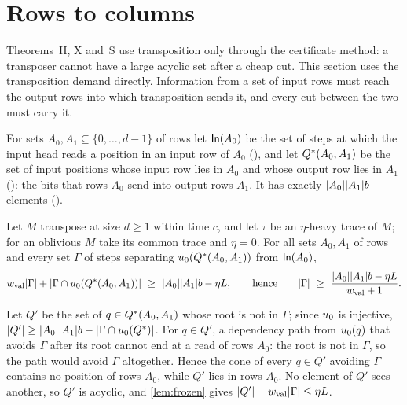 \section{Rows to columns}\label{sec:demand}

Theorems~H, X and~S use transposition only through the certificate method: a transposer cannot have a large acyclic set after
a cheap cut. This section uses the transposition demand directly. Information from a set of input rows must reach the output rows
into which transposition sends it, and every cut between the two must carry it.

For sets $A_0,A_1\subseteq\{0,\dots,d-1\}$ of rows let $\mathsf{In}(A_0)$ be the set of steps at which the input head reads a position in
an input row of $A_0$ (), and let $Q^{*}(A_0,A_1)$ be the set of input positions whose input row lies in
$A_0$ and whose output row lies in $A_1$ (): the bits that rows $A_0$ send into output rows $A_1$. It has
exactly $\lvert A_0 \rvert\lvert A_1 \rvert b$ elements ().

\begin{lemma}\label{lem:R}
Let $M$ transpose at size $d\ge1$ within time $c$, and let $\tau$ be an $\eta$-heavy trace of $M$; for an oblivious $M$ take its common
trace and $\eta=0$. For all sets $A_0,A_1$ of rows and every set $\Gamma$ of steps separating $u_0(Q^{*}(A_0,A_1))$ from $\mathsf{In}(A_0)$,
\[
  \wval\abs\Gamma+\abs{\Gamma\cap\Out(\Qstar(A_0,A_1))}\ \ge\ \abs{A_0}\abs{A_1}b-\eta L,
  \qquad\text{hence}\qquad \abs\Gamma\ \ge\ \frac{\abs{A_0}\abs{A_1}b-\eta L}{\wval+1}.
\]
\end{lemma}

\begin{outline}
Let $Q'$ be the set of $q\in Q^{*}(A_0,A_1)$ whose root is not in $\Gamma$; since $u_0$ is injective,
$\lvert Q' \rvert\ge\lvert A_0 \rvert\lvert A_1 \rvert b-\lvert \Gamma\cap u_0(Q^{*}) \rvert$. For $q\in Q'$, a dependency path from $u_0(q)$ that avoids $\Gamma$ after
its root cannot end at a read of rows $A_0$: the root is not in $\Gamma$, so the path would avoid $\Gamma$ altogether. Hence the cone of
every $q\in Q'$ avoiding $\Gamma$ contains no position of rows $A_0$, while $Q'$ lies in rows $A_0$. No element of $Q'$ sees another, so
$Q'$ is acyclic, and \cref{lem:frozen} gives $\lvert Q' \rvert-w_{\mathrm{val}}\lvert \Gamma \rvert\le\eta L$.
\end{outline}

